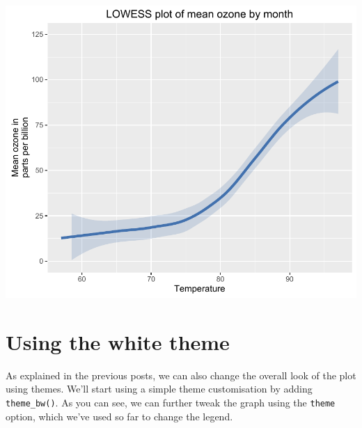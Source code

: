 \documentclass[]{article}
\begin{document}
\begin{center}\includegraphics{12_Lowess_Plots_pdf/lowess_16-1} \end{center}

\section{Using the white theme}\label{using-the-white-theme}

As explained in the previous posts, we can also change the overall look
of the plot using themes. We'll start using a simple theme customisation
by adding \texttt{theme\_bw()}. As you can see, we can further tweak the
graph using the \texttt{theme} option, which we've used so far to change
the legend.
\end{document}
